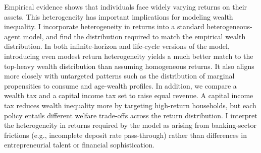 Empirical evidence shows that individuals face widely varying returns on their assets. This heterogeneity has important implications for modeling wealth inequality. I incorporate heterogeneity in returns into a standard heterogeneous-agent model, and find the distribution required to match the empirical wealth distribution. In both infinite-horizon and life-cycle versions of the model, introducing even modest return heterogeneity yields a much better match to the top-heavy wealth distribution than assuming homogeneous returns. It also aligns more closely with untargeted patterns such as the distribution of marginal propensities to consume and age-wealth profiles. In addition, we compare a wealth tax and a capital income tax set to raise equal revenue. A capital income tax reduces wealth inequality more by targeting high-return households, but each policy entails different welfare trade-offs across the return distribution. I interpret the heterogeneity in returns required by the model as arising from banking-sector frictions (e.g., incomplete deposit rate pass-through) rather than differences in entrepreneurial talent or financial sophistication.